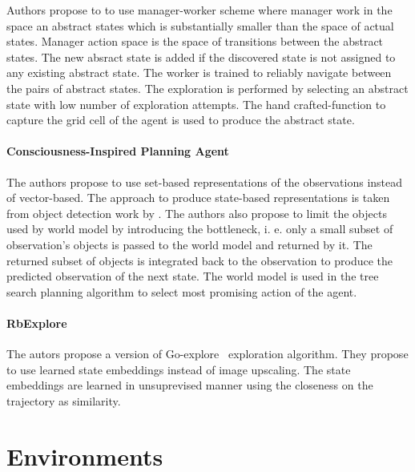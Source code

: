 \documentclass[acmsmall, nonacm]{acmart}
\begin{document}
Authors propose to to use manager-worker scheme where manager work in the space an abstract states which is substantially smaller than the space of actual states. Manager action space is the space of transitions between the abstract states. The new absract state is  added if the discovered state is not assigned to any existing abstract state. The worker is trained to reliably navigate between the pairs of abstract states. The exploration is performed by selecting an abstract state with low number of exploration attempts. The hand crafted-function to capture the grid cell of the agent is used to produce the abstract state.


\paragraph{Consciousness-Inspired Planning Agent \citet{Zhao2021ACP}}

The authors propose to use set-based representations of the observations instead of vector-based. The approach to produce state-based representations is taken from object detection work by \citet{Carion2020EndtoEndOD}. The authors also propose to limit the objects used by world model by introducing the bottleneck, i. e. only a small subset of observation's objects is passed to the world model and returned by it. The returned subset of objects is integrated back to the observation to produce the predicted observation of the next state. The world model is used in the tree search planning algorithm to select most promising action of the agent.


\paragraph{RbExplore \citet{Ugadiarov2021LongTermEI}}

The autors propose a version of Go-explore~\citet{ecoffet_first_2021} exploration algorithm. They propose to use learned state embeddings instead of image upscaling. The state embeddings are learned in unsuprevised manner using the closeness on the trajectory as similarity.


\section{Environments} %
\label{sec:environments}
\end{document}
